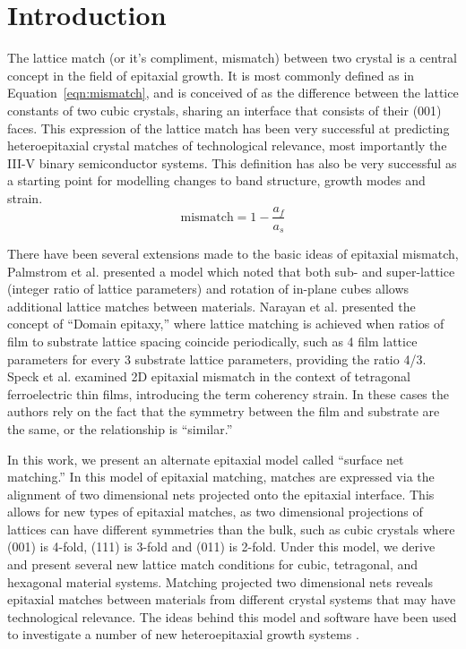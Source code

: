 \documentclass[final,5p,times,twocolumn]{elsarticle}
\begin{document}

\section{Introduction}
\label{Introduction}
The lattice match (or it’s compliment, mismatch) between two crystal is a central concept in the field of epitaxial growth. It is most commonly defined as in Equation~\ref{eqn:mismatch}, and is conceived of as the difference between the lattice constants of two cubic crystals, sharing an interface that consists of their (001) faces. This expression of the lattice match has been very successful at predicting heteroepitaxial crystal matches of technological relevance, most importantly the III-V binary semiconductor systems. This definition has also be very successful as a starting point for modelling changes to band structure\cite{Chuang1991}, growth modes\cite{Dunstan1997} and strain\cite{Dunstan1997}.
\begin{equation}
\text{mismatch} = 1 - \frac{a_f}{a_s} \label{eqn:mismatch}
\end{equation}

There have been several extensions made to the basic ideas of epitaxial mismatch, Palmstrom et al. \cite{Palmstrom1995} presented a model which noted that both sub- and super-lattice (integer ratio of lattice parameters) and rotation of in-plane cubes allows additional lattice matches between materials. Narayan et al. \cite{Narayan2003} presented the concept of ``Domain epitaxy,'' where lattice matching is achieved when ratios of film to substrate lattice spacing coincide periodically, such as 4 film lattice parameters for every 3 substrate lattice parameters, providing the ratio 4/3. Speck et al. examined 2D epitaxial mismatch in the context of tetragonal ferroelectric thin films, introducing the term coherency strain\cite{Speck1995,Speck1994,Speck1994a}. In these cases the authors rely on the fact that the symmetry between the film and substrate are the same, or the relationship is “similar.”

In this work, we present an alternate epitaxial model called ``surface net matching.'' In this model of epitaxial matching, matches are expressed via the alignment of two dimensional nets projected onto the epitaxial interface. This allows for new types of epitaxial matches, as two dimensional projections of lattices can have different symmetries than the bulk, such as cubic crystals where (001) is 4-fold, (111) is 3-fold and (011) is 2-fold. Under this model, we derive and present several new lattice match conditions for cubic, tetragonal, and hexagonal material systems. Matching projected two dimensional nets reveals epitaxial matches between materials from different crystal systems that may have technological relevance. The ideas behind this model and software have been used to investigate a number of new heteroepitaxial growth systems \cite{Devenyi2009,Neretina2006,Neretina2008b}.
\end{document}

